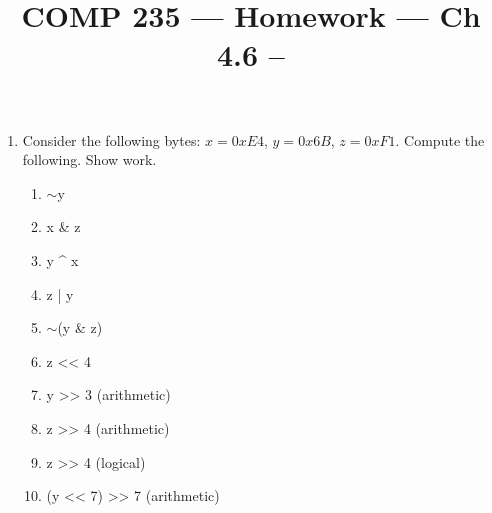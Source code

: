 \documentclass[nobib]{tufte-handout}
\title{COMP 235 --- Homework --- Ch 4.6 -- }
\author{  }
\date{ }
\begin{document}
\maketitle


\begin{enumerate}
    \item Consider the following bytes: $x = 0xE4$, $y = 0x6B$, $z=0xF1$.  Compute the following. Show work. 
    \begin{enumerate}
        \item $\sim$y
        \vspace{1.5in}
        \item x \& z
        \vspace{1.5in}
        \item y \^{} x
        \vspace{1.5in} 
        \item z | y
        \vspace{1.5in}
        \item $\sim$(y \& z)
        \newpage \thispagestyle{empty}
        \item z << 4
        \vspace{1.5in}
        \item y >> 3 (arithmetic)
        \vspace{1.5in}
        \item z >> 4 (arithmetic)          
        \vspace{1.5in}
        \item z >> 4 (logical)         
        \vspace{1.5in}
        \item (y << 7) >> 7 (arithmetic)
    \end{enumerate}
    \newpage
    \thispagestyle{empty}


\end{enumerate}
\end{document}
